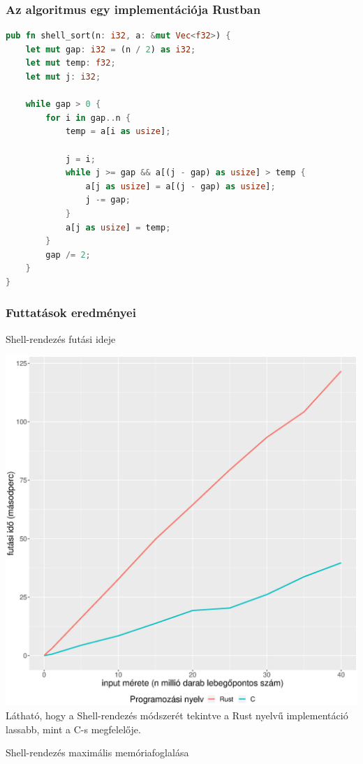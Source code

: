 \subsubsection{Az algoritmus egy implementációja Rustban}
\begin{lstlisting}[language=Rust]
pub fn shell_sort(n: i32, a: &mut Vec<f32>) {
    let mut gap: i32 = (n / 2) as i32;
    let mut temp: f32;
    let mut j: i32;

    while gap > 0 {
        for i in gap..n {
            temp = a[i as usize];

            j = i;
            while j >= gap && a[(j - gap) as usize] > temp {
                a[j as usize] = a[(j - gap) as usize];
                j -= gap;
            }
            a[j as usize] = temp;
        }
        gap /= 2;
    }
}
\end{lstlisting}
\subsubsection{Futtatások eredményei}
Shell-rendezés futási ideje

\includegraphics[width=15.5cm]{kepek/shells_sort_run.eps}
Látható, hogy a Shell-rendezés módszerét tekintve a Rust nyelvű implementáció lassabb, mint a C-s megfelelője.

\noindent Shell-rendezés maximális memóriafoglalása

